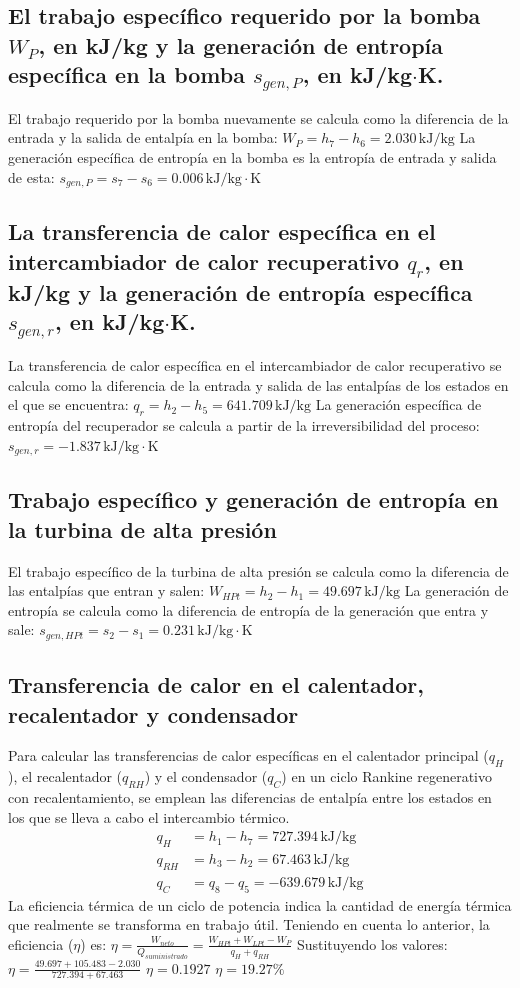 \documentclass[conference]{IEEEtran}
\theoremstyle{mytheoremstyle}
\theoremstyle{mytheoremstyle}
\theoremstyle{myproblemstyle}
\begin{document}
\subsection*{El trabajo específico requerido por la bomba $W_P$, en kJ/kg y la generación de entropía específica en la bomba $s_{gen,P}$, en kJ/kg$\cdot$K.}
El trabajo requerido por la bomba nuevamente se calcula como la diferencia de la entrada y la salida de entalpía en la bomba:
$W_P = h_7 - h_6 = 2.030 \, \text{kJ/kg}$ 
La generación específica de entropía en la bomba es la entropía de entrada y salida de esta:
$s_{gen,P} = s_7 - s_6 = 0.006 \, \text{kJ/kg}\cdot\text{K}$ 

\subsection*{La transferencia de calor específica en el intercambiador de calor recuperativo $q_r$, en kJ/kg y la generación de entropía específica $s_{gen,r}$, en kJ/kg$\cdot$K.}
La transferencia de calor específica en el intercambiador de calor recuperativo se calcula como la diferencia de la entrada y salida de las entalpías de los estados en el que se encuentra:
$q_r = h_2 - h_5 = 641.709 \, \text{kJ/kg}$ 
La generación específica de entropía del recuperador se calcula a partir de la irreversibilidad del proceso:
$s_{gen,r} = -1.837 \, \text{kJ/kg}\cdot\text{K}$ 

\subsection*{Trabajo específico y generación de entropía en la turbina de alta presión}
El trabajo específico de la turbina de alta presión se calcula como la diferencia de las entalpías que entran y salen:
$W_{HPt} = h_2 - h_1 = 49.697 \, \text{kJ/kg}$ 
La generación de entropía se calcula como la diferencia de entropía de la generación que entra y sale:
$s_{gen,HPt} = s_2 - s_1 = 0.231 \, \text{kJ/kg}\cdot\text{K}$ 

\subsection*{Transferencia de calor en el calentador, recalentador y condensador}
Para calcular las transferencias de calor específicas en el calentador principal ($q_H$), el recalentador ($q_{RH}$) y el condensador ($q_C$) en un ciclo Rankine regenerativo con recalentamiento, se emplean las diferencias de entalpía entre los estados en los que se lleva a cabo el intercambio térmico.
\begin{align*}
q_H &= h_1 - h_7 = 727.394 \, \text{kJ/kg}  \\
q_{RH} &= h_3 - h_2 = 67.463 \, \text{kJ/kg}  \\
q_C &= q_8 - q_5 = -639.679 \, \text{kJ/kg} 
\end{align*}
La eficiencia térmica de un ciclo de potencia indica la cantidad de energía térmica que realmente se transforma en trabajo útil. Teniendo en cuenta lo anterior, la eficiencia ($\eta$) es:
$\eta = \frac{W_{neto}}{Q_{suministrado}} = \frac{W_{HPt} + W_{LPt} - W_P}{q_H + q_{RH}}$ 
Sustituyendo los valores:
$\eta = \frac{49.697 + 105.483 - 2.030}{727.394 + 67.463}$ 
$\eta = 0.1927$ 
$\eta = 19.27\%$ 
\end{document}

